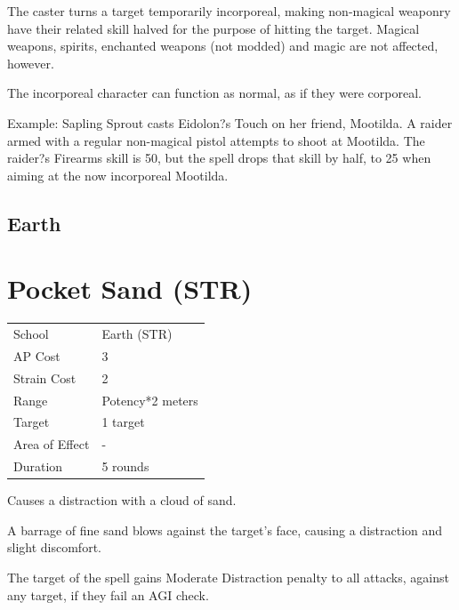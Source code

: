 \documentclass[11pt,a4paper,twocolumn]{book}
\begin{document}
	\medskip
	
	The caster turns a target temporarily incorporeal, making non-magical weaponry have their related skill halved for the purpose of hitting the target. Magical weapons, spirits, enchanted weapons (not modded) and magic are not affected, however.
	
	The incorporeal character can function as normal, as if they were corporeal.
	
	Example: Sapling Sprout casts Eidolon?s Touch on her friend, Mootilda. A raider armed with a regular non-magical pistol attempts to shoot at Mootilda. The raider?s Firearms skill is 50, but the spell drops that skill by half, to 25 when aiming at the now incorporeal Mootilda.
	
	
	\subsection*{Earth}
	
	\section*{Pocket Sand (STR)}
	{
		\begin{tabu} to 75mm{| X[l,4] | X[l,7] |}
			\hline
			School 			&  Earth (STR)			\\
			AP Cost	      	&  3					\\
			Strain Cost     &  2					\\
			Range     		&  Potency*2 meters		\\
			Target      	&  1 target				\\
			Area of Effect  &  -	 				\\
			Duration     	&  5 rounds				\\ \hline
		\end{tabu}
		
	}
	
	\medskip
	
	Causes a distraction with a cloud of sand.
	
	A barrage of fine sand blows against the target's face, causing a distraction and slight discomfort.
	
	The target of the spell gains Moderate Distraction penalty to all attacks, against any target, if they fail an AGI check.
	
\end{document}
